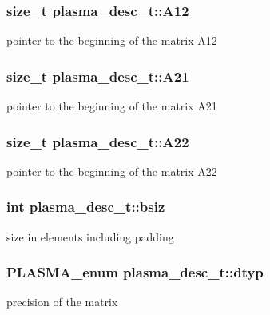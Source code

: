 \subsubsection[{A12}]{\setlength{\rightskip}{0pt plus 5cm}size\+\_\+t plasma\+\_\+desc\+\_\+t\+::\+A12}\label{structplasma__desc__t_a5081e56a01179e8b9305912676909a13_a5081e56a01179e8b9305912676909a13}
pointer to the beginning of the matrix A12 \hypertarget{structplasma__desc__t_a9749348dffa9c3584312c581f4c2bc20_a9749348dffa9c3584312c581f4c2bc20}{}
\subsubsection[{A21}]{\setlength{\rightskip}{0pt plus 5cm}size\+\_\+t plasma\+\_\+desc\+\_\+t\+::\+A21}\label{structplasma__desc__t_a9749348dffa9c3584312c581f4c2bc20_a9749348dffa9c3584312c581f4c2bc20}
pointer to the beginning of the matrix A21 \hypertarget{structplasma__desc__t_ad8485dcb9895aee64a447c70642cb554_ad8485dcb9895aee64a447c70642cb554}{}
\subsubsection[{A22}]{\setlength{\rightskip}{0pt plus 5cm}size\+\_\+t plasma\+\_\+desc\+\_\+t\+::\+A22}\label{structplasma__desc__t_ad8485dcb9895aee64a447c70642cb554_ad8485dcb9895aee64a447c70642cb554}
pointer to the beginning of the matrix A22 \hypertarget{structplasma__desc__t_a9611b974738f4accbb79e366fdcba787_a9611b974738f4accbb79e366fdcba787}{}
\subsubsection[{bsiz}]{\setlength{\rightskip}{0pt plus 5cm}int plasma\+\_\+desc\+\_\+t\+::bsiz}\label{structplasma__desc__t_a9611b974738f4accbb79e366fdcba787_a9611b974738f4accbb79e366fdcba787}
size in elements including padding \hypertarget{structplasma__desc__t_ae3456ab5010805f78b76debb9b3ec2b3_ae3456ab5010805f78b76debb9b3ec2b3}{}
\subsubsection[{dtyp}]{\setlength{\rightskip}{0pt plus 5cm}P\+L\+A\+S\+M\+A\+\_\+enum plasma\+\_\+desc\+\_\+t\+::dtyp}\label{structplasma__desc__t_ae3456ab5010805f78b76debb9b3ec2b3_ae3456ab5010805f78b76debb9b3ec2b3}
precision of the matrix \hypertarget{structplasma__desc__t_a7508194cedb3083d9152c4e2f957dc88_a7508194cedb3083d9152c4e2f957dc88}{}
